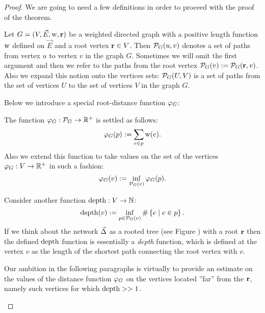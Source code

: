 \documentclass[12pt]{article}
\begin{document}
\begin{proof}
      We are going to need a few definitions in order to proceed with the proof of the theorem.
      \begin{definition}
        Let $G = (V, \vec{E},\mathrm{w}, \mathbf{r})$ be a weighted directed graph with a positive
          length function $\mathrm{w}$ defined on $\vec{E}$ and a root vertex $\mathbf{r} \in V$.
        Then $\mathcal{P}_{G}(u, v)$ denotes a set of paths from vertex $u$ to vertex $v$ in the graph $G$.
        Sometimes we will omit the first argument and then we refer to the paths from the root vertex
          $\mathcal{P}_{G}(v) := \mathcal{P}_{G}(\mathbf{r}, v)$.
        Also we expand this notion onto the vertices sets: $\mathcal{P}_{G}(U,V)$ is a set of paths
          from the set of vertices $U$ to the set of vertices $V$ in the graph $G$.
      \end{definition}
      Below we introduce a special root-distance function $\varphi_{G}$:
      \begin{definition}
        The function $\varphi_{G}: \mathcal{P}_{G} \to \mathbb{R}^{+}$ is settled as follows:
        \[
          \varphi_{G}(p) := \sum_{e \in p} \mathrm{w}(e).
        \]
        Also we extend this function to take values on the set of the vertices $\varphi_{G}: V \to \mathbb{R}^{+}$ in such a fashion:
        \[
          \varphi_{G}(v) := \inf_{\mathcal{P}_{G}(v)} \varphi_{G}(p).
        \]
      \end{definition}
      \begin{remark}
        Consider another function $\operatorname{depth}: V \to \mathbb{N}$:
        \[
          \operatorname{depth}(v) := \inf_{p \in \mathcal{P}_{G}(v)} \#\left\{e \mid e \in p\right\}.
        \]
        If we think about the network $\vec{\Delta}$ as a rooted tree (see Figure ) with a root $\mathbf{r}$
          then the defined $\operatorname{depth}$ function is essentially a \emph{depth} function, which is defined at the vertex $v$ 
          as the length of the shortest path connecting the root vertex with $v$.

        Our ambition in the following paragraphs is virtually to provide an estimate on the values of the distance function $\varphi_{G}$ on the vertices
          located ''far'' from the $\mathbf{r}$, namely such vertices for which $\operatorname{depth} >> 1$.
      \end{remark}


\end{proof}
\end{document}
